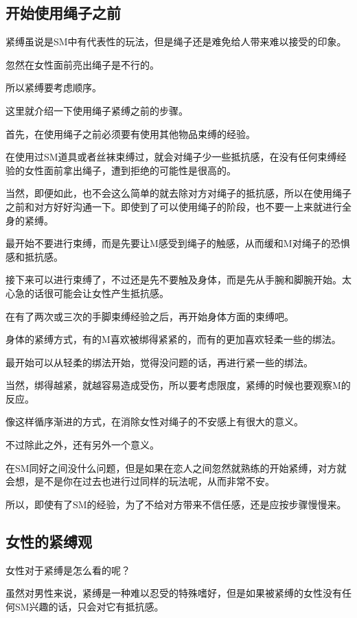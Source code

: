 \documentclass[12pt,UTF8]{ctexbook}
\begin{document}
\subsection{开始使用绳子之前}

紧缚虽说是SM中有代表性的玩法，但是绳子还是难免给人带来难以接受的印象。

忽然在女性面前亮出绳子是不行的。

所以紧缚要考虑顺序。

这里就介绍一下使用绳子紧缚之前的步骤。

首先，在使用绳子之前必须要有使用其他物品束缚的经验。

在使用过SM道具或者丝袜束缚过，就会对绳子少一些抵抗感，在没有任何束缚经验的女性面前拿出绳子，遭到拒绝的可能性是很高的。

当然，即便如此，也不会这么简单的就去除对方对绳子的抵抗感，所以在使用绳子之前和对方好好沟通一下。即使到了可以使用绳子的阶段，也不要一上来就进行全身的紧缚。

最开始不要进行束缚，而是先要让M感受到绳子的触感，从而缓和M对绳子的恐惧感和抵抗感。

接下来可以进行束缚了，不过还是先不要触及身体，而是先从手腕和脚腕开始。太心急的话很可能会让女性产生抵抗感。

在有了两次或三次的手脚束缚经验之后，再开始身体方面的束缚吧。

身体的紧缚方式，有的M喜欢被绑得紧紧的，而有的更加喜欢轻柔一些的绑法。

最开始可以从轻柔的绑法开始，觉得没问题的话，再进行紧一些的绑法。

当然，绑得越紧，就越容易造成受伤，所以要考虑限度，紧缚的时候也要观察M的反应。

像这样循序渐进的方式，在消除女性对绳子的不安感上有很大的意义。

不过除此之外，还有另外一个意义。

在SM同好之间没什么问题，但是如果在恋人之间忽然就熟练的开始紧缚，对方就会想，是不是你在过去也进行过同样的玩法呢，从而非常不安。

所以，即使有了SM的经验，为了不给对方带来不信任感，还是应按步骤慢慢来。

\subsection{女性的紧缚观}

女性对于紧缚是怎么看的呢？

虽然对男性来说，紧缚是一种难以忍受的特殊嗜好，但是如果被紧缚的女性没有任何SM兴趣的话，只会对它有抵抗感。
\end{document}
